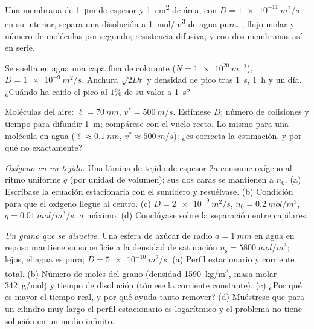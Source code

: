 \begin{exercise}[$\star$]\label{exo:b2:particle-diffusion:2}
Una membrana de \qty{1}{\micro m} de espesor y \qty{1}{cm^2} de área, con $D =
\qty{1e-11}{m^2/s}$ en su interior, separa una disolución a \qty{1}{mol/m^3}
de agua pura. , flujo molar y número de moléculas
por segundo; resistencia difusiva; y con dos membranas así en serie.
\end{exercise}

\begin{exercise}[$\star$]\label{exo:b2:particle-diffusion:3}
Se suelta en agua una capa fina de colorante ($N = \qty{1e20}{m^{-2}}$),
$D = \qty{1e-9}{m^2/s}$. Anchura $\sqrt{2Dt}$ y densidad de pico tras
\qty{1}{s}, \qty{1}{h} y un día. ¿Cuándo ha caído el pico al
$1\%$ de su valor a \qty{1}{s}?
\end{exercise}

\begin{exercise}[$\star$]\label{exo:b2:particle-diffusion:4}
Moléculas del aire: $\ell = \qty{70}{nm}$, $v^* = \qty{500}{m/s}$. Estímese
$D$; número de colisiones y tiempo para difundir \qty{1}{m}; compárese con
el vuelo recto. Lo mismo para una molécula en agua ($\ell \approx
\qty{0.1}{nm}$, $v^* \approx \qty{500}{m/s}$): ¿es correcta la estimación, y
por qué no exactamente?
\end{exercise}

\begin{exercise}[$\star\star$]\label{exo:b2:particle-diffusion:5}
\emph{Oxígeno en un tejido.} Una lámina de tejido de espesor $2a$ consume
oxígeno al ritmo uniforme $q$ (por unidad de volumen); sus dos caras se
mantienen a $n_0$. (a) Escríbase la ecuación estacionaria con el sumidero y resuélvase.
(b) Condición para que el oxígeno llegue al centro. (c) $D = \qty{2e-9}{m^2/s}$,
$n_0 = \qty{0.2}{mol/m^3}$, $q = \qty{0.01}{mol/m^3/s}$: $a$ máximo. (d)
Conclúyase sobre la separación entre capilares.
\end{exercise}

\begin{exercise}[$\star\star$]\label{exo:b2:particle-diffusion:6}
\emph{Un grano que se disuelve.} Una esfera de azúcar de radio $a = \qty{1}{mm}$
en agua en reposo mantiene su superficie a la densidad de saturación $n_{\text{s}}
= \qty{5800}{mol/m^3}$; lejos, el agua es pura; $D =
\qty{5e-10}{m^2/s}$. (a) Perfil estacionario y corriente total. (b)
Número de moles del grano (densidad \qty{1590}{kg/m^3}, masa molar
\qty{342}{g/mol}) y tiempo de disolución (tómese la corriente constante).
(c) ¿Por qué es mayor el tiempo real, y por qué ayuda tanto remover?
(d) Muéstrese que para un cilindro muy largo el perfil estacionario es
logarítmico y el problema no tiene solución en un medio infinito.
\end{exercise}

